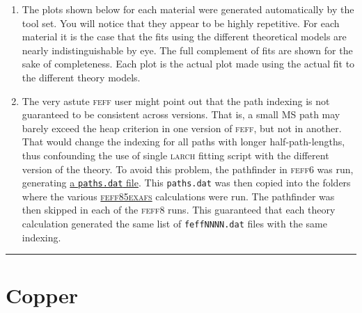 \documentclass[11pt]{article}
\begin{document}
\begin{enumerate}
\item The plots shown below for each material were generated
  automatically by the tool set.  You will notice that they appear to
  be highly repetitive.  For each material it is the case that the
  fits using the different theoretical models are nearly
  indistinguishable by eye.  The full complement of fits are shown for
  the sake of completeness.  Each plot is the actual plot made using
  the actual fit to the different theory models.

\item The very astute \textsc{feff} user might point out that the path
  indexing is not guaranteed to be consistent across versions.  That
  is, a small MS path may barely exceed the heap criterion in one
  version of \textsc{feff}, but not in another.  That would change the
  indexing for all paths with longer half-path-lengths, thus
  confounding the use of single \textsc{larch} fitting script with the
  different version of the theory.  To avoid this problem, the
  pathfinder in \textsc{feff6} was run, generating
  \href{http://leonardo.phys.washington.edu/feff/wiki/static/f/e/f/FEFF_Program_control_1397.html}{a
    \texttt{paths.dat} file}.  This \texttt{paths.dat} was then copied
  into the folders where the various
  \href{https://github.com/xraypy/feff85exafs}{\textsc{feff85exafs}}
  calculations were run.  The pathfinder was then skipped in each of
  the \textsc{feff8} runs.  This guaranteed that each theory
  calculation generated the same list of \texttt{feffNNNN.dat} files
  with the same indexing.

\end{enumerate}

\rule{\linewidth}{0.5pt}

\section{Copper}
\label{sec:orgheadline7}
\end{document}
